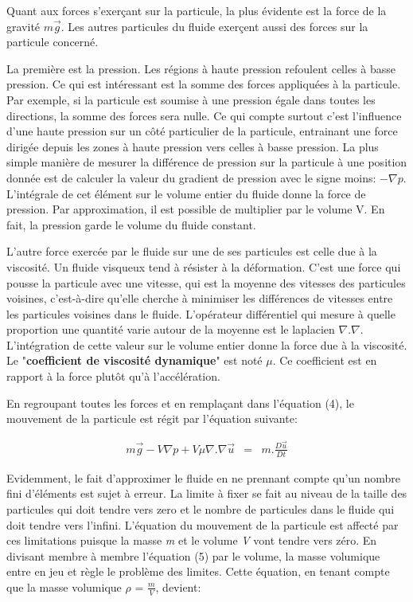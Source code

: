 \documentclass[11pt]{report}
\begin{document}
Quant aux forces s'exerçant sur la particule, la plus évidente est la force de la gravité $ m\overrightarrow{g} $. Les autres particules du fluide exerçent aussi des forces sur la particule concerné. \newline

La première est la pression. Les régions à haute pression refoulent celles à basse pression. Ce qui est intéressant est la somme des forces appliquées à la particule. Par exemple, si la particule est soumise à une pression égale dans toutes les directions, la somme des forces sera nulle. Ce qui compte surtout c'est l'influence d'une haute pression sur un côté particulier de la particule, entrainant une force dirigée depuis les zones à haute pression vers celles à basse pression. La plus simple manière de mesurer la différence de pression sur la particule à une position donnée est de calculer la valeur du gradient de pression avec le signe moins: $ - \nabla p $.
L'intégrale de cet élément sur le volume entier du fluide donne la force de pression. Par approximation, il est possible de multiplier par le volume V. En fait, la pression garde le volume du fluide constant.\newline

L'autre force exercée par le fluide sur une de ses particules est celle due à la viscosité. Un fluide visqueux tend à résister à la déformation. C'est une force qui pousse la particule avec une vitesse, qui est la moyenne des vitesses des particules voisines, c'est-à-dire qu'elle cherche à minimiser les différences de vitesses entre les particules voisines dans le fluide. L'opérateur différentiel qui mesure à quelle proportion une quantité varie autour de la moyenne est le laplacien $ \nabla . \nabla $. L'intégration de cette valeur sur le volume entier donne la force due à la viscosité. Le "\textbf{coefficient de viscosité dynamique}" est noté $ \mu $. Ce coefficient est en rapport à la force plutôt qu'à l'accélération.\newline

En regroupant toutes les forces et en remplaçant dans l'équation (4), le mouvement de la particule est régit par l'équation suivante:

\begin{eqnarray}
m\overrightarrow{g} - V \nabla p + V \mu \nabla . \nabla \overrightarrow{u} & = & m. \frac{D \overrightarrow{u}}{Dt}
\end{eqnarray}

Evidemment, le fait d'approximer le fluide en ne prennant compte qu'un nombre fini d'éléments est sujet à erreur. La limite à fixer se fait au niveau de la taille des particules qui doit tendre vers zero et le nombre de particules dans le fluide qui doit tendre vers l'infini. L'équation du mouvement de la particule est affecté par ces limitations puisque la masse \textit{m} et le volume \textit{V} vont tendre vers zéro.
En divisant membre à membre l'équation (5) par le volume, la masse volumique entre en jeu et règle le problème des limites. Cette équation, en tenant compte que la masse volumique $ \rho $ = $ \frac{m}{V} $, devient:
\end{document}
